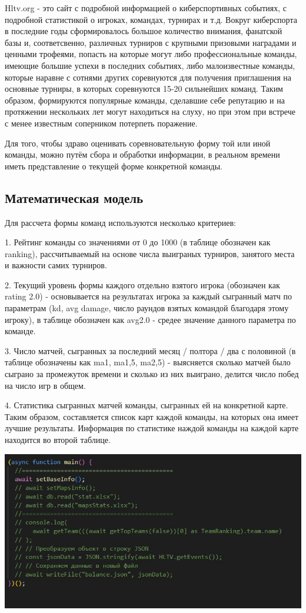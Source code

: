 \documentclass[utf8,14pt,a4paper,oneside,russian]{book}
\begin{document}
Hltv.org - это сайт с подробной информацией о киберспортивных событиях, с подробной
статистикой о игроках, командах, турнирах и т.д. Вокруг киберспорта в 
последние годы сформировалось большое количество внимания, фанатской базы и,
соответсвенно, различных турниров с крупными призовыми наградами и ценными трофеями, попасть на которые
могут либо профессиональные команды, имеющие большие успехи в последних событиях, 
либо малоизвестные команды, которые наравне с сотнями других соревнуются
для получения приглашения на основные турниры, в которых соревнуются 15-20 сильнейших
команд.
Таким образом, формируются популярные команды, сделавшие себе репутацию
и на протяжении нескольких лет могут находиться на слуху, но при этом 
при встрече с менее известным соперником потерпеть поражение.

Для того, чтобы здраво оценивать соревновательную форму той или иной команды,
можно путём сбора и обработки информации, в реальном времени иметь представление
о текущей форме конкретной команды.

\newpage
\subsection{Математическая модель}

Для рассчета формы команд используются несколько критериев:

1. Рейтинг команды со значениями от 0 до 1000 (в таблице обозначен как ranking), рассчитываемый на основе 
числа выиграных турниров, занятого места и важности самих турниров.

2. Текущий уровень формы каждого отдельно взятого игрока (обозначен как rating 2.0)
- основывается на результатах игрока за каждый сыгранный матч по параметрам (kd, avg damage, число раундов взятых командой благодаря этому игроку),
в таблице обозначен как avg2.0 - средее значение данного параметра по команде.

3. Число матчей, сыгранных за последний месяц / полтора / два с половиной 
(в таблице обозначены как ma1, ma1,5, ma2,5) - выясняется сколько матчей было сыграно
за промежуток времени и сколько из них выиграно, делится число побед на число игр в общем.

4. Статистика сыгранных матчей команды, сыгранных ей на конкретной карте. Таким образом,
составляется список карт каждой команды, на которых она имеет лучшие результаты. Информация
по статистике наждой команды на каждой карте находится во второй таблице. 


\includegraphics[width=15cm]{main}
\end{document}
